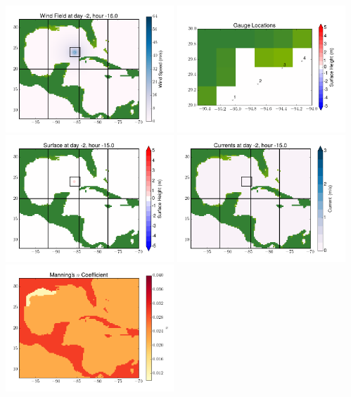 \documentclass[11pt]{article}
\begin{document}
\vskip 10pt 
\includegraphics[width=0.475\textwidth]{frame0008fig9.png}
\includegraphics[width=0.475\textwidth]{frame0008fig10.png}
\vskip 10pt 
\includegraphics[width=0.475\textwidth]{frame0009fig1.png}
\includegraphics[width=0.475\textwidth]{frame0009fig2.png}
\vskip 10pt 
\includegraphics[width=0.475\textwidth]{frame0009fig3.png}
\end{document}

